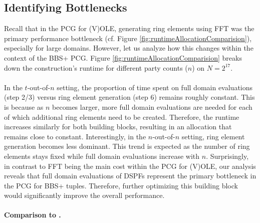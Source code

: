 \subsection{Identifying Bottlenecks}
\label{subsec:bbspPcgBottlenecks}
Recall that in the PCG for (V)OLE, generating ring elements using FFT was the primary performance bottleneck (cf. Figure \ref{fig:runtimeAllocationComparision}), especially for large domains. However, let us analyze how this changes within the context of the BBS+ PCG. Figure \ref{fig:runtimeAllocationComparision} breaks down the construction's runtime for different party counts ($n$) on $N=2^{17}$.
\\\\
In the $t$-out-of-$n$ setting, the proportion of time spent on full domain evaluations (step 2/3) versus ring element generation (step 6) remains roughly constant. This is because as $n$ becomes larger, more full domain evaluations are needed for each of which additional ring elements need to be created. Therefore, the runtime increases similarly for both building blocks, resulting in an allocation that remains close to constant. Interestingly, in the $n$-out-of-$n$ setting, ring element generation becomes less dominant. This trend is expected as the number of ring elements stays fixed while full domain evaluations increase with $n$. Surprisingly, in contrast to FFT being the main cost within the PCG for (V)OLE, our analysis reveals that full domain evaluations of DSPFs represent the primary bottleneck in the PCG for BBS+ tuples. Therefore, further optimizing this building block would significantly improve the overall performance.
\\\\
\textbf{Comparison to \cite{abram2022low}.}
